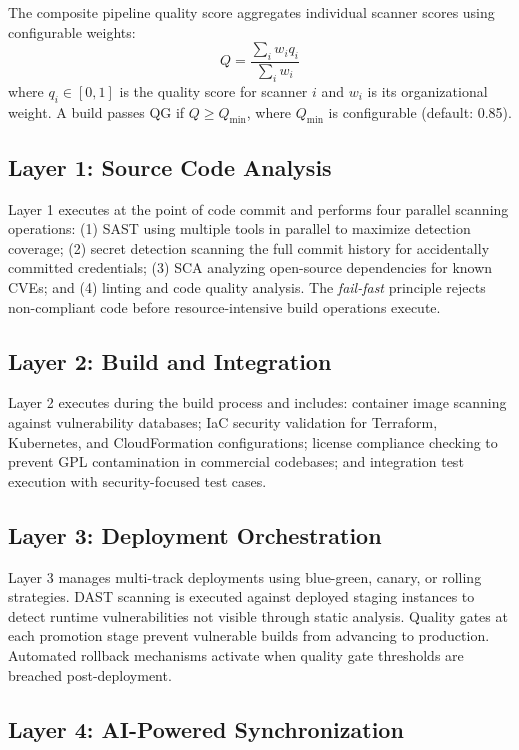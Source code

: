 \documentclass[journal]{IEEEtran}
\begin{document}
The composite pipeline quality score aggregates individual scanner scores using configurable weights:
\begin{equation}
Q = \frac{\sum_i w_i q_i}{\sum_i w_i}
\label{eq:quality}
\end{equation}
where $q_i \in [0,1]$ is the quality score for scanner $i$ and $w_i$ is its organizational weight. A build passes QG if $Q \geq Q_{\min}$, where $Q_{\min}$ is configurable (default: 0.85).

\subsection{Layer 1: Source Code Analysis}

Layer 1 executes at the point of code commit and performs four parallel scanning operations: (1) SAST using multiple tools in parallel to maximize detection coverage; (2) secret detection scanning the full commit history for accidentally committed credentials; (3) SCA analyzing open-source dependencies for known CVEs; and (4) linting and code quality analysis. The \textit{fail-fast} principle rejects non-compliant code before resource-intensive build operations execute.

\subsection{Layer 2: Build and Integration}

Layer 2 executes during the build process and includes: container image scanning against vulnerability databases; IaC security validation for Terraform, Kubernetes, and CloudFormation configurations; license compliance checking to prevent GPL contamination in commercial codebases; and integration test execution with security-focused test cases.

\subsection{Layer 3: Deployment Orchestration}

Layer 3 manages multi-track deployments using blue-green, canary, or rolling strategies. DAST scanning is executed against deployed staging instances to detect runtime vulnerabilities not visible through static analysis. Quality gates at each promotion stage prevent vulnerable builds from advancing to production. Automated rollback mechanisms activate when quality gate thresholds are breached post-deployment.

\subsection{Layer 4: AI-Powered Synchronization}
\end{document}
